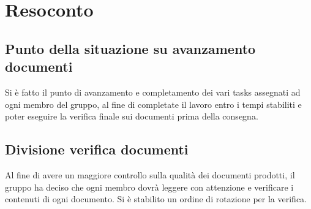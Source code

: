 \section{Resoconto}

\subsection{Punto della situazione su avanzamento documenti}
Si è fatto il punto di avanzamento e completamento dei vari tasks assegnati ad ogni membro del gruppo, al fine di completate il lavoro entro i tempi stabiliti e poter eseguire la verifica finale sui documenti prima della consegna.

\subsection{Divisione verifica documenti}
Al fine di avere un maggiore controllo sulla qualità dei documenti prodotti, il gruppo ha deciso che ogni membro dovrà leggere con attenzione e verificare i contenuti di ogni documento. Si è stabilito un ordine di rotazione per la verifica.